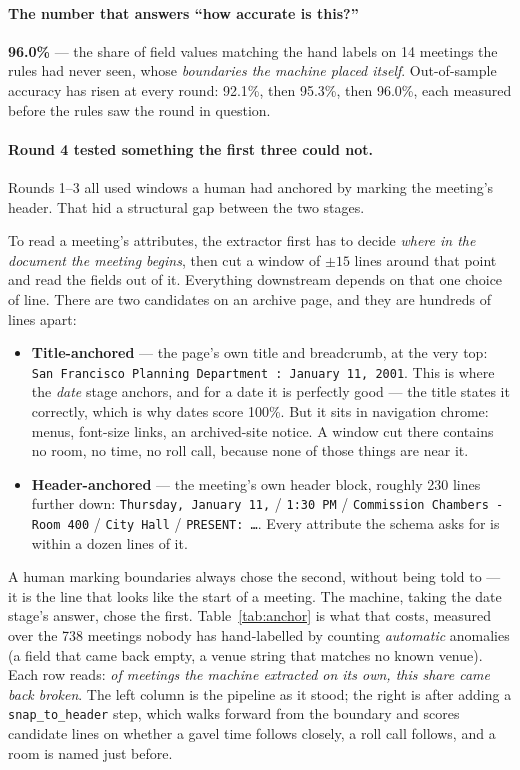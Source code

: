 \documentclass[11pt]{article}
\begin{document}
\paragraph{The number that answers ``how accurate is this?''} \textbf{96.0\%} --- the share
of field values matching the hand labels on 14 meetings the rules had never seen, whose
\emph{boundaries the machine placed itself}. Out-of-sample accuracy has risen at every
round: 92.1\%, then 95.3\%, then 96.0\%, each measured before the rules saw the round in
question.

\paragraph{Round 4 tested something the first three could not.} Rounds 1--3 all used windows
a human had anchored by marking the meeting's header. That hid a structural gap between the
two stages.

To read a meeting's attributes, the extractor first has to decide \emph{where in the
document the meeting begins}, then cut a window of $\pm15$ lines around that point and read
the fields out of it. Everything downstream depends on that one choice of line. There are
two candidates on an archive page, and they are hundreds of lines apart:

\begin{itemize}
\item \textbf{Title-anchored} --- the page's own title and breadcrumb, at the very top:
\texttt{San Francisco Planning Department : January 11, 2001}. This is where the \emph{date}
stage anchors, and for a date it is perfectly good --- the title states it correctly, which
is why dates score 100\%. But it sits in navigation chrome: menus, font-size links, an
archived-site notice. A window cut there contains no room, no time, no roll call, because
none of those things are near it.
\item \textbf{Header-anchored} --- the meeting's own header block, roughly 230 lines further
down: \texttt{Thursday, January 11,} / \texttt{1:30 PM} / \texttt{Commission Chambers - Room
400} / \texttt{City Hall} / \texttt{PRESENT: \ldots}. Every attribute the schema asks for is
within a dozen lines of it.
\end{itemize}

\noindent
A human marking boundaries always chose the second, without being told to --- it is the
line that looks like the start of a meeting. The machine, taking the date stage's answer,
chose the first. Table~\ref{tab:anchor} is what that costs, measured over the 738 meetings
nobody has hand-labelled by counting \emph{automatic} anomalies (a field that came back
empty, a venue string that matches no known venue). Each row reads: \emph{of meetings the
machine extracted on its own, this share came back broken}. The left column is the pipeline
as it stood; the right is after adding a \texttt{snap\_to\_header} step, which walks forward
from the boundary and scores candidate lines on whether a gavel time follows closely, a roll
call follows, and a room is named just before.
\end{document}
